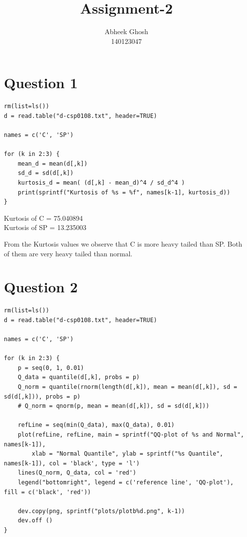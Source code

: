 \documentclass{article}
\begin{document}
	\title{\textbf{Assignment-2}}
	\author{Abheek Ghosh \\ 
		140123047 }
	
	\maketitle
	

\section{Question 1}


\begin{lstlisting}
rm(list=ls())
d = read.table("d-csp0108.txt", header=TRUE)

names = c('C', 'SP')

for (k in 2:3) {
	mean_d = mean(d[,k])
	sd_d = sd(d[,k])
	kurtosis_d = mean( (d[,k] - mean_d)^4 / sd_d^4 )
	print(sprintf("Kurtosis of %s = %f", names[k-1], kurtosis_d))
}
\end{lstlisting}

Kurtosis of C = 75.040894\\
Kurtosis of SP = 13.235003

From the Kurtosis values we observe that C is more heavy tailed than SP. Both of them are very heavy tailed than normal.


\section{Question 2}


\begin{lstlisting}
rm(list=ls())
d = read.table("d-csp0108.txt", header=TRUE)

names = c('C', 'SP')

for (k in 2:3) {
	p = seq(0, 1, 0.01)
	Q_data = quantile(d[,k], probs = p)
	Q_norm = quantile(rnorm(length(d[,k]), mean = mean(d[,k]), sd = sd(d[,k])), probs = p)
	# Q_norm = qnorm(p, mean = mean(d[,k]), sd = sd(d[,k]))
	
	refLine = seq(min(Q_data), max(Q_data), 0.01)
	plot(refLine, refLine, main = sprintf("QQ-plot of %s and Normal", names[k-1]), 
		xlab = "Normal Quantile", ylab = sprintf("%s Quantile", names[k-1]), col = 'black', type = 'l')
	lines(Q_norm, Q_data, col = 'red')
	legend("bottomright", legend = c('reference line', 'QQ-plot'), fill = c('black', 'red'))
	
	dev.copy(png, sprintf("plots/plotb%d.png", k-1))
	dev.off ()
}
\end{lstlisting}
\end{document}
